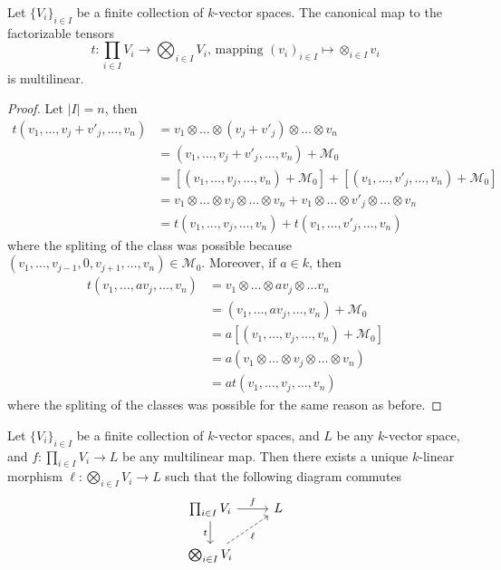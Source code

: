 \begin{lemma}\label{lem: tensor map}
  Let \(\{V_i\}_{i \in I}\) be a finite collection of \(k\)-vector spaces. The
  canonical map to the factorizable tensors
  \[
    t: \prod_{i \in I} V_i \to \bigotimes_{i \in I} V_i
    \text{, mapping }
    (v_i)_{i \in I} \longmapsto \otimes_{i \in I} v_i
  \]
  is multilinear.
\end{lemma}

\begin{proof}
  Let \(|I| = n\), then
  \begin{align*}
    t(v_1, \dots, v_j + v'_j, \dots, v_n)
    &= v_1 \otimes \dots \otimes (v_j + v'_j) \otimes \dots \otimes v_n
    \\
    &= (v_1, \dots, v_j + v'_j, \dots, v_n) + \mathcal M_0
    \\
    &= [(v_1, \dots, v_j, \dots, v_n) + \mathcal M_0]
    + [(v_1, \dots, v'_j, \dots, v_n) + \mathcal M_0]
    \\
    &= v_1 \otimes \dots \otimes v_j \otimes \dots \otimes v_n
    + v_1 \otimes \dots \otimes v'_j \otimes \dots \otimes v_n
    \\
    &= t(v_1, \dots, v_j, \dots, v_n) + t(v_1, \dots, v'_j, \dots, v_n)
  \end{align*}
  where the spliting of the class was possible because \((v_1, \dots, v_{j -1},
  0, v_{j+1}, \dots, v_n) \in \mathcal M_0\). Moreover, if \(a \in k\), then
  \begin{align*}
    t(v_1, \dots, a v_j, \dots, v_n)
    &= v_1 \otimes \dots \otimes a v_j \otimes \dots v_n
    \\
    &= (v_1, \dots, a v_j, \dots, v_n) + \mathcal M_0
    \\
    &= a[(v_1, \dots, v_j, \dots, v_n) + \mathcal M_0]
    \\
    &= a (v_1 \otimes \dots \otimes v_j \otimes \dots \otimes v_n)
    \\
    &= a t(v_1, \dots, v_j, \dots, v_n)
  \end{align*}
  where the spliting of the classes was possible for the same reason as before.
\end{proof}

\begin{theorem}
  \label{thm: universal property of tensor products}
  Let \(\{V_i\}_{i \in I}\) be a finite collection of \(k\)-vector spaces, and
  \(L\) be any \(k\)-vector space, and \(f: \prod_{i \in I} V_i \to L\) be any
  multilinear map. Then there exists a unique \(k\)-linear morphism \(\ell :
  \bigotimes_{i \in I} V_i \to L\) such that the following diagram commutes
  \[
    \begin{tikzcd}
      \prod_{i \in I} V_i
      \ar[r, "f"]
      \ar[d, swap, "t"]
        &L \\
      \bigotimes_{i \in I} V_i
      \ar[ur, swap, dashed, "\ell"]
    \end{tikzcd}
  \]
\end{theorem}

